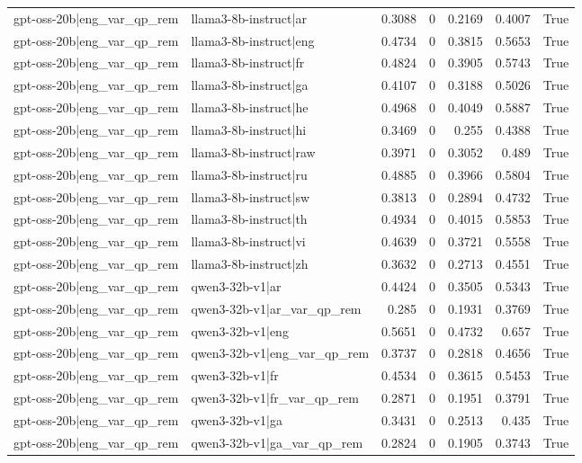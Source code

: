 \begin{table}
\begin{tabular}{l l r r r r l}
gpt-oss-20b|eng_var_qp_rem & llama3-8b-instruct|ar & 0.3088 & 0 & 0.2169 & 0.4007 & True \\
gpt-oss-20b|eng_var_qp_rem & llama3-8b-instruct|eng & 0.4734 & 0 & 0.3815 & 0.5653 & True \\
gpt-oss-20b|eng_var_qp_rem & llama3-8b-instruct|fr & 0.4824 & 0 & 0.3905 & 0.5743 & True \\
gpt-oss-20b|eng_var_qp_rem & llama3-8b-instruct|ga & 0.4107 & 0 & 0.3188 & 0.5026 & True \\
gpt-oss-20b|eng_var_qp_rem & llama3-8b-instruct|he & 0.4968 & 0 & 0.4049 & 0.5887 & True \\
gpt-oss-20b|eng_var_qp_rem & llama3-8b-instruct|hi & 0.3469 & 0 & 0.255 & 0.4388 & True \\
gpt-oss-20b|eng_var_qp_rem & llama3-8b-instruct|raw & 0.3971 & 0 & 0.3052 & 0.489 & True \\
gpt-oss-20b|eng_var_qp_rem & llama3-8b-instruct|ru & 0.4885 & 0 & 0.3966 & 0.5804 & True \\
gpt-oss-20b|eng_var_qp_rem & llama3-8b-instruct|sw & 0.3813 & 0 & 0.2894 & 0.4732 & True \\
gpt-oss-20b|eng_var_qp_rem & llama3-8b-instruct|th & 0.4934 & 0 & 0.4015 & 0.5853 & True \\
gpt-oss-20b|eng_var_qp_rem & llama3-8b-instruct|vi & 0.4639 & 0 & 0.3721 & 0.5558 & True \\
gpt-oss-20b|eng_var_qp_rem & llama3-8b-instruct|zh & 0.3632 & 0 & 0.2713 & 0.4551 & True \\
gpt-oss-20b|eng_var_qp_rem & qwen3-32b-v1|ar & 0.4424 & 0 & 0.3505 & 0.5343 & True \\
gpt-oss-20b|eng_var_qp_rem & qwen3-32b-v1|ar_var_qp_rem & 0.285 & 0 & 0.1931 & 0.3769 & True \\
gpt-oss-20b|eng_var_qp_rem & qwen3-32b-v1|eng & 0.5651 & 0 & 0.4732 & 0.657 & True \\
gpt-oss-20b|eng_var_qp_rem & qwen3-32b-v1|eng_var_qp_rem & 0.3737 & 0 & 0.2818 & 0.4656 & True \\
gpt-oss-20b|eng_var_qp_rem & qwen3-32b-v1|fr & 0.4534 & 0 & 0.3615 & 0.5453 & True \\
gpt-oss-20b|eng_var_qp_rem & qwen3-32b-v1|fr_var_qp_rem & 0.2871 & 0 & 0.1951 & 0.3791 & True \\
gpt-oss-20b|eng_var_qp_rem & qwen3-32b-v1|ga & 0.3431 & 0 & 0.2513 & 0.435 & True \\
gpt-oss-20b|eng_var_qp_rem & qwen3-32b-v1|ga_var_qp_rem & 0.2824 & 0 & 0.1905 & 0.3743 & True \\

\end{tabular}
\end{table}
